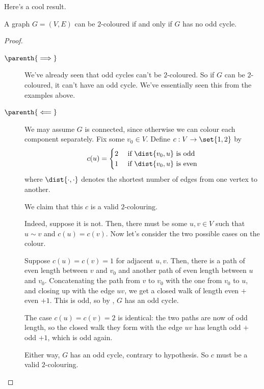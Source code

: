 Here's a cool result.

\begin{boxtheorem}
    A graph $G = (V, E)$ can be $2$-coloured if and only if $G$ has no odd cycle.
\end{boxtheorem}
\begin{proof} \hfill
    \begin{description}
        \item[$\parenth{\implies}$] We've already seen that odd cycles can't be $2$-coloured. So if $G$ can be $2$-coloured, it can't have an odd cycle. We've essentially seen this from the examples above.

        \item[$\parenth{\impliedby}$] We may assume $G$ is connected, since otherwise we can colour each component separately. Fix some $v_0 \in V$. Define $c : V \to \set{1, 2}$ by
        \begin{align*}
            c(u) =
            \begin{cases}
                2 & \text{ if } \dist{v_0, u} \text{ is odd} \\
                1 & \text{ if } \dist{v_0, u} \text{ is even}
            \end{cases}
        \end{align*}
        where $\dist{\cdot, \cdot}$ denotes the shortest number of edges from one vertex to another.

        We claim that this $c$ is a valid $2$-colouring.

        Indeed, suppose it is not. Then, there must be some $u, v \in V$ such that $u \sim v$ and $c(u) = c(v)$. Now let's consider the two possible cases on the colour.

        Suppose $c(u) = c(v) = 1$ for adjacent $u, v$. Then, there is a path of even length between $v$ and $v_0$ and another path of even length between $u$ and $v_0$. Concatenating the path from $v$ to $v_0$ with the one from $v_0$ to $u$, and closing up with the edge $uv$, we get a closed walk of length even $+$ even $+ 1$. This is odd, so by , $G$ has an odd cycle.

        The case $c(u) = c(v) = 2$ is identical: the two paths are now of odd length, so the closed walk they form with the edge $uv$ has length odd $+$ odd $+ 1$, which is odd again.

        Either way, $G$ has an odd cycle, contrary to hypothesis. So $c$ must be a valid $2$-colouring.
    \end{description}
\end{proof}

